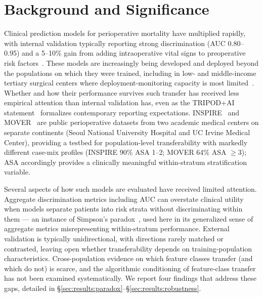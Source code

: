 


\section{Background and Significance}
\label{sec:intro}

Clinical prediction models for perioperative mortality have multiplied rapidly, with internal validation typically reporting strong discrimination (AUC 0.80--0.95) and a 5--10\% gain from adding intraoperative vital signs to preoperative risk factors~\cite{Xue2021, Fritz2019}. These models are increasingly being developed and deployed beyond the populations on which they were trained, including in low- and middle-income tertiary surgical centers where deployment-monitoring capacity is most limited~\cite{Finlayson2021, eylerdang2024kidsor}. Whether and how their performance survives such transfer has received less empirical attention than internal validation has, even as the TRIPOD+AI statement~\cite{Collins2024} formalizes contemporary reporting expectations. INSPIRE~\cite{Lim2024} and MOVER~\cite{Samad2023} are public perioperative datasets from two academic medical centers on separate continents (Seoul National University Hospital and UC Irvine Medical Center), providing a testbed for population-level transferability with markedly different case-mix profiles (INSPIRE 90\% ASA 1--2; MOVER 64\% ASA $\geq 3$); ASA accordingly provides a clinically meaningful within-stratum stratification variable.

Several aspects of how such models are evaluated have received limited attention. Aggregate discrimination metrics including AUC can overstate clinical utility when models separate patients into risk strata without discriminating within them --- an instance of Simpson's paradox~\cite{Simpson1951}, used here in its generalized sense of aggregate metrics misrepresenting within-stratum performance. External validation is typically unidirectional, with directions rarely matched or contrasted, leaving open whether transferability depends on training-population characteristics. Cross-population evidence on which feature classes transfer (and which do not) is scarce, and the algorithmic conditioning of feature-class transfer has not been examined systematically. We report four findings that address these gaps, detailed in \S\ref{sec:results:paradox}--\S\ref{sec:results:robustness}.

